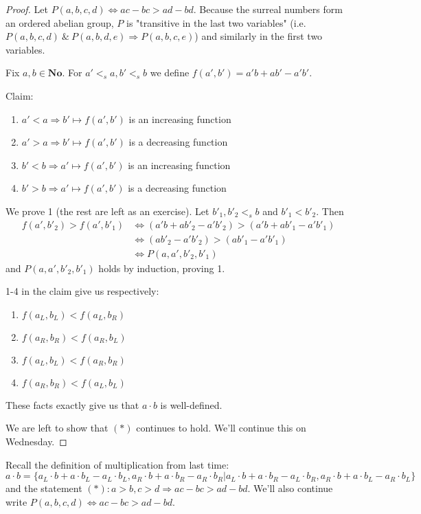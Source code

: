 \begin{proof}
Let $P(a,b,c,d)\Leftrightarrow ac - bc > ad - bd.$ Because the surreal numbers form an ordered abelian group, $P$ is  "transitive in the last two variables" (i.e. $P(a,b,c,d) \ \&\ P(a,b,d,e) \Rightarrow P(a,b,c,e)$) and similarly in the first two variables.

Fix $a,b\in \mathbf{No}$. For $a' <_s a, b' <_s b$ we define $f(a',b') = a'b + ab' - a'b'$.

Claim:
\begin{enumerate}
	\item  $a' < a \Rightarrow b' \mapsto f(a',b')$ is an increasing function
	\item  $a' > a \Rightarrow b' \mapsto f(a',b')$ is a decreasing function
	\item  $b' < b \Rightarrow a' \mapsto f(a',b')$ is an increasing function
	\item  $b' > b \Rightarrow a' \mapsto f(a',b')$ is a decreasing function
\end{enumerate}

We prove 1 (the rest are left as an exercise). Let $b'_1,b'_2 <_s b$ and $b'_1 < b'_2$. Then
\begin{align*}
f(a',b'_2) > f(a',b'_1) &\Leftrightarrow (a'b + ab'_2 - a'b'_2) > (a'b + ab'_1 - a'b'_1)  \\
&\Leftrightarrow (ab'_2 - a'b'_2) > (ab'_1 - a'b'_1) \\
&\Leftrightarrow P(a,a',b'_2,b'_1)
\end{align*}
and $P(a,a',b'_2,b'_1)$ holds by induction, proving 1.

1-4 in the claim give us respectively:
\begin{enumerate}
  \item  $f(a_L, b_L) < f(a_L, b_R)$
  \item  $f(a_R, b_R) < f(a_R, b_L)$
  \item  $f(a_L, b_L) < f(a_R, b_R)$
  \item  $f(a_R, b_R) < f(a_L, b_L)$
\end{enumerate}

These facts exactly give us that $a\cdot b$ is well-defined.

We are left to show that $(*)$ continues to hold. We'll continue this on Wednesday.
\end{proof}


Recall the definition of multiplication from last time:
\[
a\cdot b = \{a_L\cdot b + a\cdot b_L - a_L\cdot b_L, a_R\cdot b + a\cdot b_R - a_R\cdot b_R | a_L\cdot b + a\cdot b_R - a_L\cdot b_R, a_R\cdot b + a\cdot b_L - a_R\cdot b_L \}
\]
and the statement $(*): a>b, c>d \Rightarrow ac-bc > ad-bd$. We'll also continue write $P(a,b,c,d)\Leftrightarrow ac - bc > ad - bd$.

